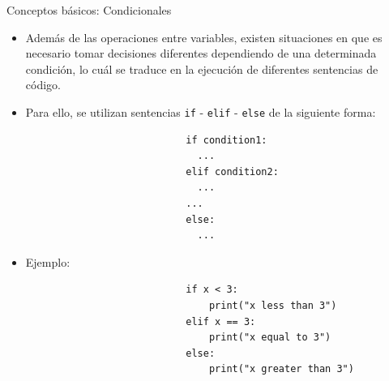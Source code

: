 \documentclass{beamer}
\begin{document}
    \begin{frame}[fragile]{Conceptos básicos: Condicionales}
        \begin{itemize}
          \item Además de las operaciones entre variables, existen situaciones en que es necesario tomar decisiones diferentes dependiendo de una determinada condición, lo cuál se traduce en la ejecución de diferentes sentencias de código.
          \item Para ello, se utilizan sentencias \texttt{if} - \texttt{elif} - \texttt{else} de la siguiente forma:

          \begin{figure}
              \begin{minipage}[c]{0.5\textwidth}
                  \begin{verbatim}
                      if condition1:
                        ...
                      elif condition2:
                        ...
                      ...
                      else:
                        ...
                  \end{verbatim}
              \end{minipage}
          \end{figure}
          \item Ejemplo:
          \begin{figure}
              \begin{minipage}[c]{0.5\textwidth}
                  \begin{verbatim}
                      if x < 3:
                          print("x less than 3")
                      elif x == 3:
                          print("x equal to 3")
                      else:
                          print("x greater than 3")
                  \end{verbatim}
              \end{minipage}
          \end{figure}
        \end{itemize}
    \end{frame}
\end{document}
